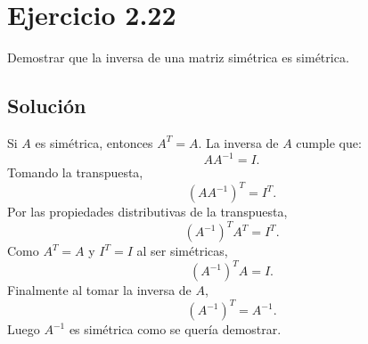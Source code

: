 \documentclass{article}
\begin{document}
\section*{Ejercicio 2.22}

Demostrar que la inversa de una matriz simétrica es simétrica.

\subsection*{Solución}
Si \(A\) es simétrica, entonces \(A^T=A\). La inversa de \(A\) cumple que:
\[
AA^{-1}=I.
\]
Tomando la transpuesta,
\[
(AA^{-1})^T=I^T.
\]
Por las propiedades distributivas de la transpuesta,
\[
(A^{-1})^T A^T = I^T.
\]
Como \(A^T=A\) y \(I^T=I\) al ser simétricas,
\[
(A^{-1})^T A = I.
\]
Finalmente al tomar la inversa de \(A\),
\[
\boxed{(A^{-1})^T = A^{-1}.}
\]
Luego \(A^{-1}\) es simétrica como se quería demostrar.
\end{document}
